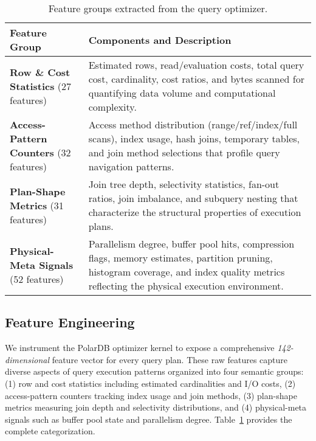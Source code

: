 \documentclass[sigconf, nonacm]{acmart}
\begin{document}
\begin{table}[t]
  \centering
  \small
  \renewcommand{\arraystretch}{1.4}
  \setlength{\tabcolsep}{4pt}
  \caption{Feature groups extracted from the query optimizer.}
  \label{tab:feature-groups}
  \begin{tabularx}{\columnwidth}{@{}
    >{\raggedright\arraybackslash}p{}
    >{\raggedright\arraybackslash}X@{}}
    \toprule
    \textbf{Feature Group} & \textbf{Components and Description} \\
    \midrule
    
    \textbf{Row \& Cost Statistics} \newline (27 features) &
    Estimated rows, read/evaluation costs, total query cost, cardinality, cost ratios, and bytes scanned for quantifying data volume and computational complexity. \\
    
    \textbf{Access-Pattern Counters} \newline (32 features) &
    Access method distribution (range/ref/index/full scans), index usage, hash joins, temporary tables, and join method selections that profile query navigation patterns. \\
    
    \textbf{Plan-Shape Metrics} \newline (31 features) &
    Join tree depth, selectivity statistics, fan-out ratios, join imbalance, and subquery nesting that characterize the structural properties of execution plans. \\
    
    \textbf{Physical-Meta Signals} \newline (52 features) &
    Parallelism degree, buffer pool hits, compression flags, memory estimates, partition pruning, histogram coverage, and index quality metrics reflecting the physical execution environment. \\
    
    \bottomrule
  \end{tabularx}
\end{table}


\subsection{Feature Engineering}
\label{ssec:feature_engineering}

We instrument the PolarDB optimizer kernel to expose a comprehensive \emph{142-dimensional} feature vector for every query plan. These raw features capture diverse aspects of query execution patterns organized into four semantic groups: (1) row and cost statistics including estimated cardinalities and I/O costs, (2) access-pattern counters tracking index usage and join methods, (3) plan-shape metrics measuring join depth and selectivity distributions, and (4) physical-meta signals such as buffer pool state and parallelism degree. Table~\ref{tab:feature-groups} provides the complete categorization.
\end{document}
